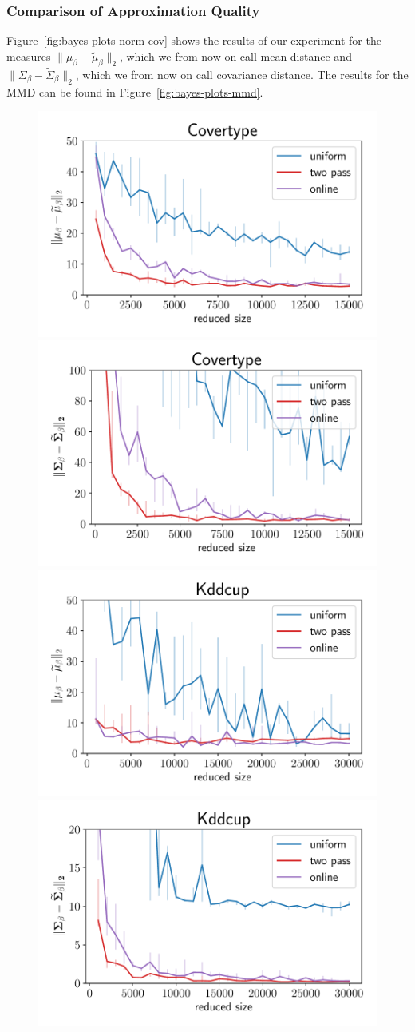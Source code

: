 \subsubsection{Comparison of Approximation Quality}

Figure~\ref{fig:bayes-plots-norm-cov} shows the results of our
experiment for the measures
$\lVert \mu_\beta - \widetilde{\mu}_\beta \rVert_2$, which
we from now on call mean distance and
$\lVert \Sigma_\beta - \widetilde{\Sigma}_\beta \rVert_2$,
which we from now on call covariance distance.
The results for the MMD can be found in Figure~\ref{fig:bayes-plots-mmd}.

\begin{figure}[ht!]
    \centering
    \includegraphics[width=.49\linewidth]{figures/covertype_bayes_plot_norm.pdf}
    \includegraphics[width=.49\linewidth]{figures/covertype_bayes_plot_matrix_norm.pdf}
    \includegraphics[width=.49\linewidth]{figures/kddcup_bayes_plot_norm.pdf}
    \includegraphics[width=.49\linewidth]{figures/kddcup_bayes_plot_matrix_norm.pdf}

\end{figure}
